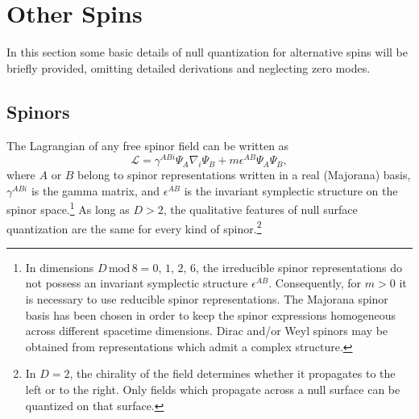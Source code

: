 \documentclass{article}
\begin{document}
\section{Other Spins}\label{spin}

In this section some basic details of null quantization for alternative spins will be briefly provided, omitting detailed derivations and neglecting zero modes.

\subsection{Spinors}

The Lagrangian of any free spinor field can be written as
\begin{equation}\label{spinorL}
\mathcal{L} =  \gamma^{ABi} \Psi_A \nabla_i \Psi_B + m \epsilon^{AB} \Psi_A \Psi_B,
\end{equation}
where $A$ or $B$ belong to spinor representations written in a real (Majorana) basis, $\gamma^{ABi}$ is the gamma matrix, and $\epsilon^{AB}$ is the invariant symplectic structure on the spinor space.\footnote{In dimensions $D\,\mathrm{mod}\,8 = 0,\,1,\,2,\,6$, the irreducible spinor representations do not possess an invariant symplectic structure $\epsilon^{AB}$.  Consequently, for $m > 0$ it is necessary to use reducible spinor representations.  The Majorana spinor basis has been chosen in order to keep the spinor expressions homogeneous across different spacetime dimensions.  Dirac and/or Weyl spinors may be obtained from representations which admit a complex structure.} As long as $D > 2$, the qualitative features of null surface quantization are the same for every kind of spinor.\footnote{In $D = 2$, the chirality of the field determines whether it propagates to the left or to the right.  Only fields which propagate across a null surface can be quantized on that surface.}
\end{document}
